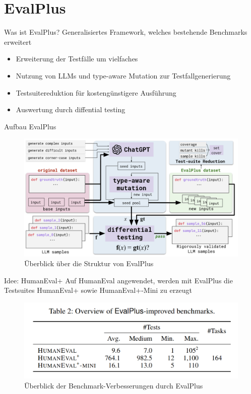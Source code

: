 \documentclass{beamer}              %
\begin{document}
\section{EvalPlus}
\begin{frame}{Was ist EvalPlus?}
Generalisiertes Framework, welches bestehende Benchmarks erweitert\cite{liu2024your}
\begin{itemize}
    \item Erweiterung der Testfälle um vielfaches
    \item Nutzung von LLMs und type-aware Mutation zur Testfallgenerierung
    \item Testsuitereduktion für kostengünstigere Ausführung
    \item Auswertung durch diffential testing\cite{mckeeman1998differential}
\end{itemize}
\end{frame}

\begin{frame}{Aufbau EvalPlus}
    \begin{figure}
        \centering
        \includegraphics[width=0.8\paperwidth]{images/overviewEplus.png}
        \caption{Überblick über die Struktur von EvalPlus\cite{chen2021evaluating}}
    \end{figure}
\end{frame}

\begin{frame}{Idee: HumanEval+}
Auf HumanEval angewendet, werden mit EvalPlus die Testsuites HumanEval+ sowie HumanEval+-Mini zu erzeugt
    \begin{figure}
        \centering
        \includegraphics[width=0.6\paperwidth]{images/humanevalbenchmarkbulk.png}
        \caption{Überblick der Benchmark-Verbesserungen durch EvalPlus\cite{liu2024your}}
    \end{figure}
\end{frame}
\end{document}
